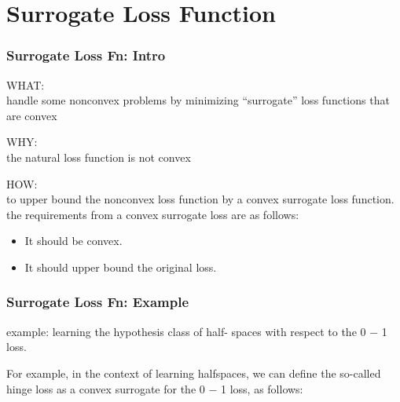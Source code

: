 \section{Surrogate Loss Function}

\begin{frame}
\frametitle{Surrogate Loss Fn: Intro}

WHAT:\\
handle some nonconvex problems
by minimizing “surrogate” loss functions that are convex
\vspace{2mm}

WHY:\\
the natural loss function is not convex
\vspace{2mm}

HOW:\\
to upper bound the nonconvex loss function by a convex surrogate loss function.
the requirements from a convex surrogate loss are as follows:
\begin{itemize}
    \item It should be convex.
    \item It should upper bound the original loss.
\end{itemize}
\end{frame}

\begin{frame}
\frametitle{Surrogate Loss Fn: Example}
example:
learning the hypothesis class of half-
spaces with respect to the 0 − 1 loss.

For example, in the context of learning halfspaces, we can define the so-called
hinge loss as a convex surrogate for the 0 − 1 loss, as follows:

\end{frame}



